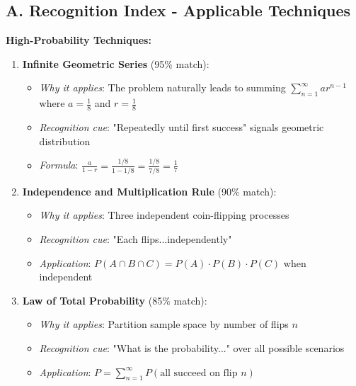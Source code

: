 \documentclass[11pt]{article}
\begin{document}
\begin{conversionbox}
\subsection*{A. Recognition Index - Applicable Techniques}

\textbf{High-Probability Techniques:}
\begin{enumerate}
    \item \textbf{Infinite Geometric Series} (95\% match):
    \begin{itemize}
        \item \textit{Why it applies}: The problem naturally leads to summing $\sum_{n=1}^{\infty} ar^{n-1}$ where $a = \frac{1}{8}$ and $r = \frac{1}{8}$
        \item \textit{Recognition cue}: "Repeatedly until first success" signals geometric distribution
        \item \textit{Formula}: $\frac{a}{1-r} = \frac{1/8}{1-1/8} = \frac{1/8}{7/8} = \frac{1}{7}$
    \end{itemize}
    
    \item \textbf{Independence and Multiplication Rule} (90\% match):
    \begin{itemize}
        \item \textit{Why it applies}: Three independent coin-flipping processes
        \item \textit{Recognition cue}: "Each flips...independently"
        \item \textit{Application}: $P(A \cap B \cap C) = P(A) \cdot P(B) \cdot P(C)$ when independent
    \end{itemize}
    
    \item \textbf{Law of Total Probability} (85\% match):
    \begin{itemize}
        \item \textit{Why it applies}: Partition sample space by number of flips $n$
        \item \textit{Recognition cue}: "What is the probability..." over all possible scenarios
        \item \textit{Application}: $P = \sum_{n=1}^{\infty} P(\text{all succeed on flip } n)$
    \end{itemize}
\end{enumerate}


\end{conversionbox}
\end{document}

